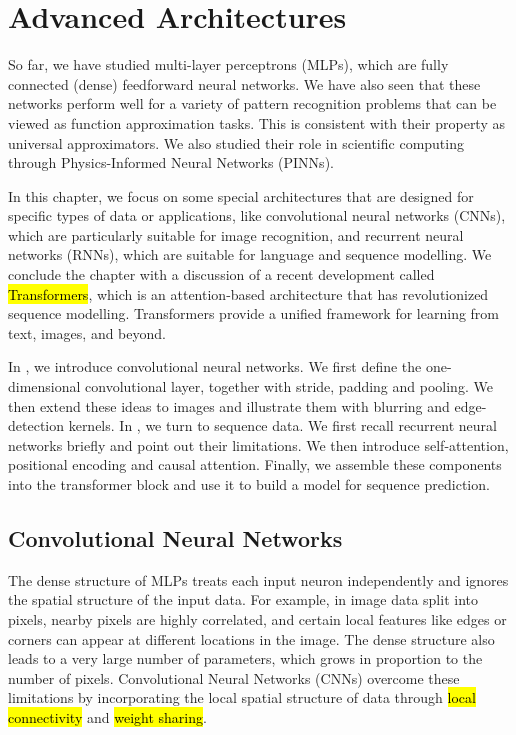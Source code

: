 \chapter{Advanced Architectures}\label{advanced.architectures.ch}
So far, we have studied multi-layer perceptrons (MLPs), which are fully connected (dense) feedforward neural networks.  We have also seen that these networks perform well for a variety of pattern recognition problems that can be viewed as function approximation tasks. This is consistent with their property as universal approximators. We also studied their role in scientific computing through Physics-Informed Neural Networks (PINNs).


In this chapter, we focus on some special architectures that are designed for specific types of data or applications, like convolutional neural networks (CNNs), which are particularly suitable for image recognition, and recurrent neural networks (RNNs), which are suitable for language and sequence modelling.  We conclude the chapter with a discussion of a recent development called \hl{Transformers}, which is an attention-based architecture that has revolutionized sequence modelling. Transformers provide a unified framework for learning from text, images, and beyond.

In , we introduce convolutional neural networks. We first define the one-dimensional convolutional layer, together with stride, padding and pooling. We then extend these ideas to images and illustrate them with blurring and edge-detection kernels. In , we turn to sequence data. We first recall recurrent neural networks briefly and point out their limitations. We then introduce self-attention, positional encoding and causal attention. Finally, we assemble these components into the transformer block and use it to build a model for sequence prediction.
\section{Convolutional Neural Networks}\label{convolution.neural.network.sec}
The dense structure of MLPs treats each input neuron independently and ignores the spatial structure of the input data. For example, in image data split into pixels, nearby pixels are highly correlated, and certain local features like edges or corners can appear at different locations in the image. The dense structure also leads to a very large number of parameters, which grows in proportion to the number of pixels. Convolutional Neural Networks (CNNs) overcome these limitations by incorporating the local spatial structure of data through \hl{local connectivity} and \hl{weight sharing}.

